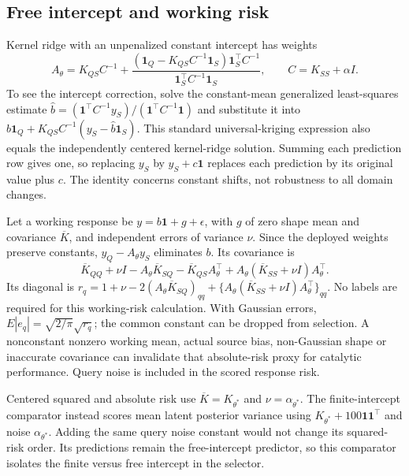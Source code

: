 \subsection{Free intercept and working risk}
Kernel ridge with an unpenalized constant intercept has weights
\begin{equation}\label{eq:si-matchedA}
A_\theta=K_{QS}C^{-1}+\frac{(\mathbf1_Q-K_{QS}C^{-1}\mathbf1_S)\mathbf1_S^\top C^{-1}}
{\mathbf1_S^\top C^{-1}\mathbf1_S},\qquad C=K_{SS}+\alpha I.
\end{equation}
To see the intercept correction, solve the constant-mean generalized least-squares estimate $\widehat b=(\mathbf1^\top C^{-1}y_S)/(\mathbf1^\top C^{-1}\mathbf1)$ and substitute it into $\widehat b\mathbf1_Q+K_{QS}C^{-1}(y_S-\widehat b\mathbf1_S)$. This standard universal-kriging expression also equals the independently centered kernel-ridge solution. Summing each prediction row gives one, so replacing $y_S$ by $y_S+c\mathbf1$ replaces each prediction by its original value plus $c$. The identity concerns constant shifts, not robustness to all domain changes.

Let a working response be $y=b\mathbf1+g+\epsilon$, with $g$ of zero shape mean and covariance $\overline K$, and independent errors of variance $\nu$. Since the deployed weights preserve constants, $y_Q-A_\theta y_S$ eliminates $b$. Its covariance is
\begin{equation}
\overline K_{QQ}+\nu I-A_\theta\overline K_{SQ}
-\overline K_{QS}A_\theta^\top
+A_\theta(\overline K_{SS}+\nu I)A_\theta^\top.
\end{equation}
Its diagonal is $r_q=1+\nu-2(A_\theta\overline K_{SQ})_{qq}+\{A_\theta(\overline K_{SS}+\nu I)A_\theta^\top\}_{qq}$. No labels are required for this working-risk calculation. With Gaussian errors, $E|e_q|=\sqrt{2/\pi}\sqrt{r_q}$; the common constant can be dropped from selection. A nonconstant nonzero working mean, actual source bias, non-Gaussian shape or inaccurate covariance can invalidate that absolute-risk proxy for catalytic performance. Query noise is included in the scored response risk.

Centered squared and absolute risk use $\overline K=K_{\theta^*}$ and $\nu=\alpha_{\theta^*}$. The finite-intercept comparator instead scores mean latent posterior variance using $K_{\theta^*}+100\mathbf1\mathbf1^\top$ and noise $\alpha_{\theta^*}$. Adding the same query noise constant would not change its squared-risk order. Its predictions remain the free-intercept predictor, so this comparator isolates the finite versus free intercept in the selector.

